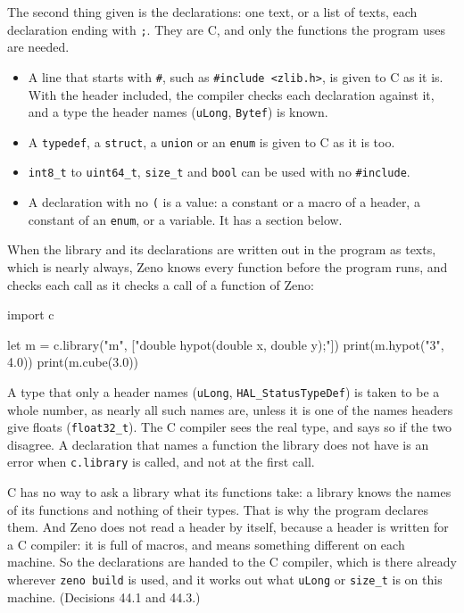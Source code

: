 The second thing given is the declarations: one text, or a list of
texts, each declaration ending with \verb|;|. They are C, and only the
functions the program uses are needed.

\begin{itemize}
\item A line that starts with \verb|#|, such as
  \verb|#include <zlib.h>|, is given to C as it is. With the header
  included, the compiler checks each declaration against it, and a
  type the header names (\verb|uLong|, \verb|Bytef|) is known.
\item A \verb|typedef|, a \verb|struct|, a \verb|union| or an
  \verb|enum| is given to C as it is too.
\item \verb|int8_t| to \verb|uint64_t|, \verb|size_t| and \verb|bool|
  can be used with no \verb|#include|.
\item A declaration with no \verb|(| is a value: a constant or a macro
  of a header, a constant of an \verb|enum|, or a variable. It has a
  section below.
\end{itemize}

When the library and its declarations are written out in the program
as texts, which is nearly always, Zeno knows every function before the
program runs, and checks each call as it checks a call of a function
of Zeno:

\begin{zeno}[file=wrong.zeno, dir=maths, cmd=zeno check {file}, fails=yes]
import c

let m = c.library("m", ["double hypot(double x, double y);"])
print(m.hypot("3", 4.0))
print(m.cube(3.0))
\end{zeno}

A type that only a header names (\verb|uLong|,
\texttt{HAL\_Status\-TypeDef}) is taken to be a whole number, as nearly
all such names are, unless it is one of the names headers give floats
(\verb|float32_t|). The C compiler sees the real type, and says so if
the two disagree. A declaration that names a function the library does
not have is an error when \verb|c.library| is called, and not at the
first call.

\begin{why}
C has no way to ask a library what its functions take: a library
knows the names of its functions and nothing of their types. That is
why the program declares them. And Zeno does not read a header by
itself, because a header is written for a C compiler: it is full of
macros, and means something different on each machine. So the
declarations are handed to the C compiler, which is there already
wherever \verb|zeno build| is used, and it works out what
\verb|uLong| or \verb|size_t| is on this machine. (Decisions 44.1 and
44.3.)
\end{why}

